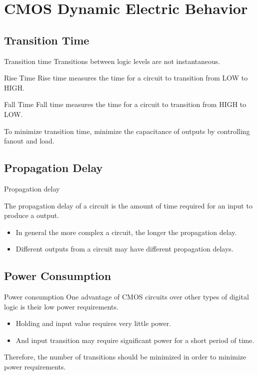 \section{CMOS Dynamic Electric Behavior}

\subsection{Transition Time}

\begin{frame}{Transition time}
  Transitions between logic levels are not instantaneous.
  \begin{block}{Rise Time}
    \alert{Rise time} measures the time for a circuit to transition from LOW to HIGH.
  \end{block}
  \begin{block}{Fall Time}
    \alert{Fall time} measures the time for a circuit to transition from HIGH to LOW.
  \end{block}
  To minimize transition time, minimize the capacitance of outputs by controlling fanout and load.
\end{frame}

\subsection{Propagation Delay}

\begin{frame}{Propagation delay}
  \begin{definition}
    The \alert{propagation delay} of a circuit is the amount of time required for an input to produce a output.
  \end{definition}
  \begin{itemize}
    \item In general the more complex a circuit, the longer the propagation delay.
    \item Different outputs from a circuit may have different propagation delays.
  \end{itemize}
\end{frame}

\subsection{Power Consumption}

\begin{frame}{Power consumption}
  One advantage of CMOS circuits over other types of digital logic is their low power requirements.
  \begin{itemize}
    \item Holding and input value requires very little power.
    \item And input transition may require significant power for a short period of time.
  \end{itemize}
  Therefore, the number of transitions should be minimized in order to minimize power requirements.
\end{frame}


